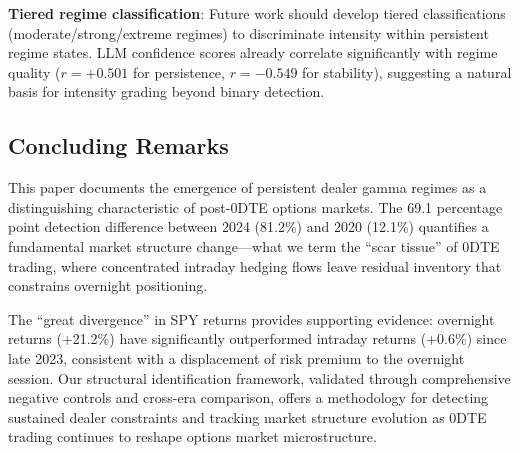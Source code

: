 \textbf{Tiered regime classification}: Future work should develop tiered classifications (moderate/strong/extreme regimes) to discriminate intensity within persistent regime states. LLM confidence scores already correlate significantly with regime quality ($r = +0.501$ for persistence, $r = -0.549$ for stability), suggesting a natural basis for intensity grading beyond binary detection.

\subsection{Concluding Remarks}

This paper documents the emergence of persistent dealer gamma regimes as a distinguishing characteristic of post-0DTE options markets. The 69.1 percentage point detection difference between 2024 (81.2\%) and 2020 (12.1\%) quantifies a fundamental market structure change---what we term the ``scar tissue'' of 0DTE trading, where concentrated intraday hedging flows leave residual inventory that constrains overnight positioning.

The ``great divergence'' in SPY returns provides supporting evidence: overnight returns (+21.2\%) have significantly outperformed intraday returns (+0.6\%) since late 2023, consistent with a displacement of risk premium to the overnight session. Our structural identification framework, validated through comprehensive negative controls and cross-era comparison, offers a methodology for detecting sustained dealer constraints and tracking market structure evolution as 0DTE trading continues to reshape options market microstructure.

